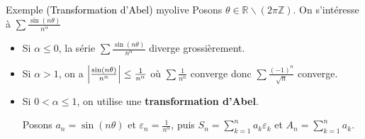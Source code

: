     \begin{omed}{Exemple \textcolor{black}{(Transformation d’Abel)} }{myolive}
        Posons $\theta \in \mathbb{R} \backslash \left(2 \pi \mathbb{Z}\right)$. On s’intéresse à $\sum \frac{\sin(n\theta)}{n^{\alpha}}$ 
        \begin{itemize}
            \item Si $\alpha \leq 0$, la série $\sum \frac{\sin(n\theta)}{n^{\alpha}}$ diverge grossièrement. 
            \item Si $\alpha > 1$, on a $\left\lvert \frac{\sin(n\theta)}{n^{\alpha}}\right\rvert \leq \frac{1}{n^{\alpha}}$ où $\sum \frac{1}{n^{\alpha}}$ converge donc $\sum \frac{(-1)^n}{\sqrt{n}}$ converge.
            \item Si $0 < \alpha \leq 1$, on utilise une \textbf{transformation d’Abel}. 
            
            Posons $a_n = \sin(n \theta)$ et $\varepsilon_n = \frac{1}{n^{\alpha}}$, puis $S_n = \sum_{k=1}^{n} a_k \varepsilon_k$ et $A_n = \sum_{k=1}^{n} a_k$.
    

\end{itemize}
\end{omed}

